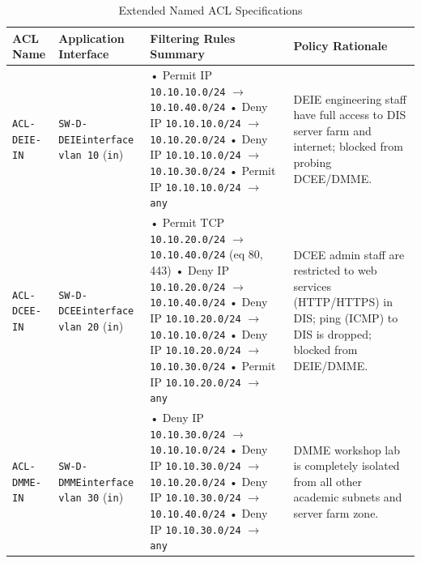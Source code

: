 \documentclass[11pt,a4paper]{article}
\begin{document}
\begin{table}[htbp]
\centering
\caption{Extended Named ACL Specifications}
\label{tab:acls}
\small
\begin{tabularx}{\textwidth}{@{}l p{3.5cm} L L@{}}
\toprule
\textbf{ACL Name} & \textbf{Application Interface} & \textbf{Filtering Rules Summary} & \textbf{Policy Rationale} \\
\midrule
\texttt{ACL-DEIE-IN} & \texttt{SW-D-DEIE}\newline \texttt{interface vlan 10} (\texttt{in}) &
• Permit IP \texttt{10.10.10.0/24} $\rightarrow$ \texttt{10.10.40.0/24}\newline
• Deny IP \texttt{10.10.10.0/24} $\rightarrow$ \texttt{10.10.20.0/24}\newline
• Deny IP \texttt{10.10.10.0/24} $\rightarrow$ \texttt{10.10.30.0/24}\newline
• Permit IP \texttt{10.10.10.0/24} $\rightarrow$ \texttt{any} &
DEIE engineering staff have full access to DIS server farm and internet; blocked from probing DCEE/DMME. \\
\midrule
\texttt{ACL-DCEE-IN} & \texttt{SW-D-DCEE}\newline \texttt{interface vlan 20} (\texttt{in}) &
• Permit TCP \texttt{10.10.20.0/24} $\rightarrow$ \texttt{10.10.40.0/24} (eq 80, 443)\newline
• Deny IP \texttt{10.10.20.0/24} $\rightarrow$ \texttt{10.10.40.0/24}\newline
• Deny IP \texttt{10.10.20.0/24} $\rightarrow$ \texttt{10.10.10.0/24}\newline
• Deny IP \texttt{10.10.20.0/24} $\rightarrow$ \texttt{10.10.30.0/24}\newline
• Permit IP \texttt{10.10.20.0/24} $\rightarrow$ \texttt{any} &
DCEE admin staff are restricted to web services (HTTP/HTTPS) in DIS; ping (ICMP) to DIS is dropped; blocked from DEIE/DMME. \\
\midrule
\texttt{ACL-DMME-IN} & \texttt{SW-D-DMME}\newline \texttt{interface vlan 30} (\texttt{in}) &
• Deny IP \texttt{10.10.30.0/24} $\rightarrow$ \texttt{10.10.10.0/24}\newline
• Deny IP \texttt{10.10.30.0/24} $\rightarrow$ \texttt{10.10.20.0/24}\newline
• Deny IP \texttt{10.10.30.0/24} $\rightarrow$ \texttt{10.10.40.0/24}\newline
• Deny IP \texttt{10.10.30.0/24} $\rightarrow$ \texttt{any} &
DMME workshop lab is completely isolated from all other academic subnets and server farm zone. \\

\end{tabularx}
\end{table}
\end{document}
